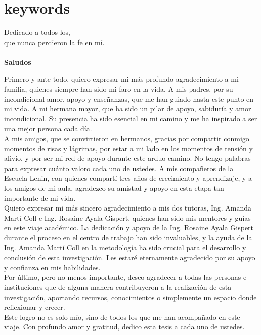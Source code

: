 \documentclass[
	spanish, %
	letterpaper, oneside
]{book}
\begin{document}
\section*{keywords}




\begin{dedicatory}
	Dedicado a todos los, \\
	que nunca perdieron la fe en mí. \\
	~ \\
	\textbf{Saludos}
\end{dedicatory}

\begin{acknowledgments}
	Primero y ante todo, quiero expresar mi más profundo agradecimiento a mi familia, quienes siempre han sido mi faro en la vida. A mis padres, por su incondicional amor, apoyo y enseñanzas, que me han guiado hasta este punto en mi vida. A mi hermana mayor, que ha sido un pilar de apoyo, sabiduría y amor incondicional. Su presencia ha sido esencial en mi camino y me ha inspirado a ser una mejor persona cada día.\\

	A mis amigos, que se convirtieron en hermanos, gracias por compartir conmigo momentos de risas y lágrimas, por estar a mi lado en los momentos de tensión y alivio, y por ser mi red de apoyo durante este arduo camino. No tengo palabras para expresar cuánto valoro cada uno de ustedes. A mis compañeros de la Escuela Lenin, con quienes compartí tres años de crecimiento y aprendizaje, y a los amigos de mi aula, agradezco su amistad y apoyo en esta etapa tan importante de mi vida.\\

	Quiero expresar mi más sincero agradecimiento a mis dos tutoras, Ing. Amanda Martí Coll e Ing. Rosaine Ayala Gispert, quienes han sido mis mentores y guías en este viaje académico. La dedicación y apoyo de la Ing. Rosaine Ayala Gispert durante el proceso en el centro de trabajo han sido invaluables, y la ayuda de la Ing. Amanda Martí Coll en la metodología ha sido crucial para el desarrollo y conclusión de esta investigación. Les estaré eternamente agradecido por su apoyo y confianza en mis habilidades.\\

	Por último, pero no menos importante, deseo agradecer a todas las personas e instituciones que de alguna manera contribuyeron a la realización de esta investigación, aportando recursos, conocimientos o simplemente un espacio donde reflexionar y crecer.\\

	Este logro no es solo mío, sino de todos los que me han acompañado en este viaje. Con profundo amor y gratitud, dedico esta tesis a cada uno de ustedes.
\end{acknowledgments}
\end{document}
